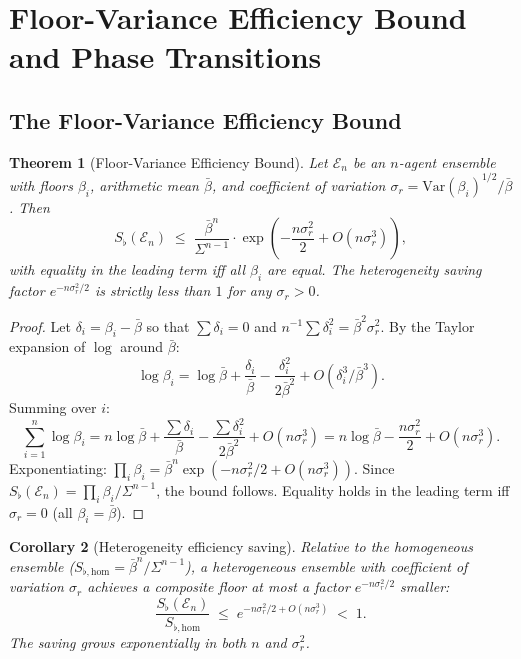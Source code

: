 \documentclass[twocolumn,11pt,a4paper]{article}
\newtheorem{theorem}{Theorem}[section]
\newtheorem{corollary}[theorem]{Corollary}
\theoremstyle{remark}
\newcommand{\Sflat}{S_{\flat}}
\newcommand{\Ens}{\mathcal{E}}
\newcommand{\Var}{\mathrm{Var}}           %
\newcommand{\CV}{\sigma_r}               %
\newcommand{\Sflathom}{S_{\flat,\mathrm{hom}}}  %
\begin{document}
\section{Floor-Variance Efficiency Bound and Phase Transitions}
\label{sec:fvb}

\subsection{The Floor-Variance Efficiency Bound}
\label{sec:fvb:bound}

\begin{theorem}[Floor-Variance Efficiency Bound]
\label{thm:fvb}
Let $\Ens_n$ be an $n$-agent ensemble with floors $\beta_i$, arithmetic mean
$\bar\beta$, and coefficient of variation $\CV = \Var(\beta_i)^{1/2}/\bar\beta$.
Then
\[
  \Sflat(\Ens_n) \;\le\; \frac{\bar\beta^n}{\Sigma^{n-1}} \cdot
  \exp\!\left(-\frac{n\CV^2}{2} + O(n\CV^3)\right),
\]
with equality in the leading term iff all $\beta_i$ are equal.
The heterogeneity saving factor $e^{-n\CV^2/2}$ is strictly less than $1$
for any $\CV>0$.
\end{theorem}
\begin{proof}
Let $\delta_i = \beta_i - \bar\beta$ so that $\sum \delta_i = 0$ and
$n^{-1}\sum \delta_i^2 = \bar\beta^2 \CV^2$.  By the Taylor expansion of
$\log$ around $\bar\beta$:
\[
  \log \beta_i = \log\bar\beta + \frac{\delta_i}{\bar\beta}
  - \frac{\delta_i^2}{2\bar\beta^2} + O(\delta_i^3/\bar\beta^3).
\]
Summing over $i$:
\[
  \sum_{i=1}^n \log\beta_i = n\log\bar\beta + \frac{\sum \delta_i}{\bar\beta}
  - \frac{\sum \delta_i^2}{2\bar\beta^2} + O(n\CV^3)
  = n\log\bar\beta - \frac{n\CV^2}{2} + O(n\CV^3).
\]
Exponentiating: $\prod_i \beta_i = \bar\beta^n \exp(-n\CV^2/2 + O(n\CV^3))$.
Since $\Sflat(\Ens_n) = \prod_i \beta_i/\Sigma^{n-1}$, the bound follows.
Equality holds in the leading term iff $\CV = 0$ (all $\beta_i = \bar\beta$).
\end{proof}

\begin{corollary}[Heterogeneity efficiency saving]
\label{cor:saving}
Relative to the homogeneous ensemble ($\Sflathom = \bar\beta^n/\Sigma^{n-1}$),
a heterogeneous ensemble with coefficient of variation $\CV$ achieves a
composite floor at most a factor $e^{-n\CV^2/2}$ smaller:
\[
  \frac{\Sflat(\Ens_n)}{\Sflathom} \;\le\;
  e^{-n\CV^2/2+O(n\CV^3)} \;<\; 1.
\]
The saving grows exponentially in both $n$ and $\CV^2$.
\end{corollary}
\end{document}
